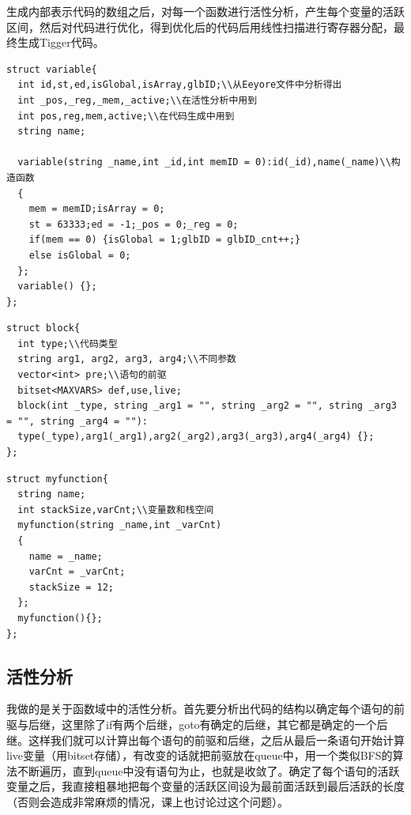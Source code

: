 \documentclass{ctexart}
\begin{document}
生成内部表示代码的数组之后，对每一个函数进行活性分析，产生每个变量的活跃区间，然后对代码进行优化，得到优化后的代码后用线性扫描进行寄存器分配，最终生成Tigger代码。

\begin{lstlisting}[basicstyle=\listingsfont,caption={变量结构},captionpos=b]
struct variable{
  int id,st,ed,isGlobal,isArray,glbID;\\从Eeyore文件中分析得出
  int _pos,_reg,_mem,_active;\\在活性分析中用到
  int pos,reg,mem,active;\\在代码生成中用到
  string name;

  variable(string _name,int _id,int memID = 0):id(_id),name(_name)\\构造函数
  {
    mem = memID;isArray = 0;
    st = 63333;ed = -1;_pos = 0;_reg = 0;
    if(mem == 0) {isGlobal = 1;glbID = glbID_cnt++;}
    else isGlobal = 0;
  };
  variable() {};
};
\end{lstlisting}
\begin{lstlisting}[basicstyle=\listingsfont,caption={代码块结构},captionpos=b]
struct block{
  int type;\\代码类型
  string arg1, arg2, arg3, arg4;\\不同参数
  vector<int> pre;\\语句的前驱
  bitset<MAXVARS> def,use,live;
  block(int _type, string _arg1 = "", string _arg2 = "", string _arg3 = "", string _arg4 = ""):
  type(_type),arg1(_arg1),arg2(_arg2),arg3(_arg3),arg4(_arg4) {};
};
\end{lstlisting}
\begin{lstlisting}[basicstyle=\listingsfont,caption={函数结构},captionpos=b]
struct myfunction{
  string name;
  int stackSize,varCnt;\\变量数和栈空间
  myfunction(string _name,int _varCnt)
  {
    name = _name;
    varCnt = _varCnt;
    stackSize = 12;
  };
  myfunction(){};
};
\end{lstlisting}

\subsection{活性分析}

我做的是关于函数域中的活性分析。首先要分析出代码的结构以确定每个语句的前驱与后继，这里除了if有两个后继，goto有确定的后继，其它都是确定的一个后继。这样我们就可以计算出每个语句的前驱和后继，之后从最后一条语句开始计算live变量（用bitset存储），有改变的话就把前驱放在queue中，用一个类似BFS的算法不断遍历，直到queue中没有语句为止，也就是收敛了。确定了每个语句的活跃变量之后，我直接粗暴地把每个变量的活跃区间设为最前面活跃到最后活跃的长度（否则会造成非常麻烦的情况，课上也讨论过这个问题）。
\end{document}
